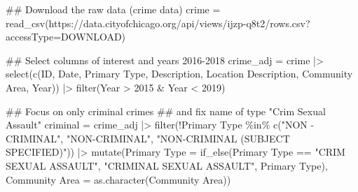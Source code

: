 \documentclass[
]{report}
\newenvironment{Shaded}{}{}
\newcommand{\AttributeTok}[1]{\textcolor[rgb]{0.84,0.23,0.29}{#1}}
\newcommand{\DecValTok}[1]{\textcolor[rgb]{0.00,0.36,0.77}{#1}}
\newcommand{\DocumentationTok}[1]{\textcolor[rgb]{0.42,0.45,0.49}{#1}}
\newcommand{\FunctionTok}[1]{\textcolor[rgb]{0.44,0.26,0.76}{#1}}
\newcommand{\NormalTok}[1]{\textcolor[rgb]{0.14,0.16,0.18}{#1}}
\newcommand{\OtherTok}[1]{\textcolor[rgb]{0.44,0.26,0.76}{#1}}
\newcommand{\SpecialCharTok}[1]{\textcolor[rgb]{0.00,0.36,0.77}{#1}}
\newcommand{\StringTok}[1]{\textcolor[rgb]{0.01,0.18,0.38}{#1}}
\begin{document}
\begin{Shaded}
\begin{Highlighting}[]
\DocumentationTok{\#\# Download the raw data (crime data)}
\NormalTok{crime }\OtherTok{=} \FunctionTok{read\_csv}\NormalTok{(}\StringTok{\textquotesingle{}https://data.cityofchicago.org/api/views/ijzp{-}q8t2/rows.csv?accessType=DOWNLOAD\textquotesingle{}}\NormalTok{)}

\DocumentationTok{\#\# Select columns of interest and years 2016{-}2018}
\NormalTok{crime\_adj }\OtherTok{=}\NormalTok{ crime }\SpecialCharTok{|\textgreater{}} 
  \FunctionTok{select}\NormalTok{(}\FunctionTok{c}\NormalTok{(ID, Date, }\StringTok{\textasciigrave{}}\AttributeTok{Primary Type}\StringTok{\textasciigrave{}}\NormalTok{, Description, }\StringTok{\textasciigrave{}}\AttributeTok{Location Description}\StringTok{\textasciigrave{}}\NormalTok{, }\StringTok{\textasciigrave{}}\AttributeTok{Community Area}\StringTok{\textasciigrave{}}\NormalTok{, Year)) }\SpecialCharTok{|\textgreater{}} 
  \FunctionTok{filter}\NormalTok{(Year }\SpecialCharTok{\textgreater{}} \DecValTok{2015} \SpecialCharTok{\&}\NormalTok{ Year }\SpecialCharTok{\textless{}} \DecValTok{2019}\NormalTok{)}

\DocumentationTok{\#\# Focus on only criminal crimes}
\DocumentationTok{\#\# and fix name of type "Crim Sexual Assault"}
\NormalTok{criminal }\OtherTok{=}\NormalTok{ crime\_adj }\SpecialCharTok{|\textgreater{}} 
  \FunctionTok{filter}\NormalTok{(}\SpecialCharTok{!}\StringTok{\textasciigrave{}}\AttributeTok{Primary Type}\StringTok{\textasciigrave{}} \SpecialCharTok{\%in\%} \FunctionTok{c}\NormalTok{(}\StringTok{"NON {-} CRIMINAL"}\NormalTok{, }\StringTok{"NON{-}CRIMINAL"}\NormalTok{, }\StringTok{"NON{-}CRIMINAL (SUBJECT SPECIFIED)"}\NormalTok{)) }\SpecialCharTok{|\textgreater{}} 
  \FunctionTok{mutate}\NormalTok{(}\StringTok{\textasciigrave{}}\AttributeTok{Primary Type}\StringTok{\textasciigrave{}} \OtherTok{=} \FunctionTok{if\_else}\NormalTok{(}\StringTok{\textasciigrave{}}\AttributeTok{Primary Type}\StringTok{\textasciigrave{}} \SpecialCharTok{==} \StringTok{"CRIM SEXUAL ASSAULT"}\NormalTok{, }\StringTok{"CRIMINAL SEXUAL ASSAULT"}\NormalTok{, }\StringTok{\textasciigrave{}}\AttributeTok{Primary Type}\StringTok{\textasciigrave{}}\NormalTok{),}
         \StringTok{\textasciigrave{}}\AttributeTok{Community Area}\StringTok{\textasciigrave{}} \OtherTok{=} \FunctionTok{as.character}\NormalTok{(}\StringTok{\textasciigrave{}}\AttributeTok{Community Area}\StringTok{\textasciigrave{}}\NormalTok{))}


\end{Highlighting}
\end{Shaded}
\end{document}
